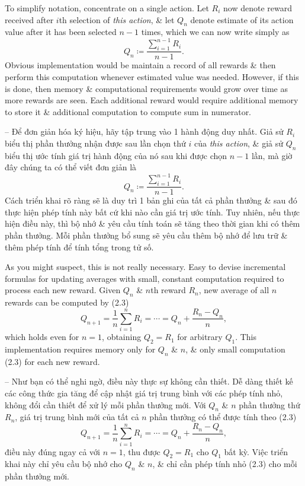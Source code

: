 \documentclass{article}
\begin{document}
\begin{itemize}
\begin{itemize}
        To simplify notation, concentrate on a single action. Let $R_i$ now denote reward received after $i$th selection of {\it this action}, \& let $Q_n$ denote estimate of its action value after it has been selected $n - 1$ times, which we can now write simply as
        \begin{equation*}
            Q_n\coloneqq\frac{\sum_{i=1}^{n-1} R_i}{n - 1}.
        \end{equation*}
        Obvious implementation would be maintain a record of all rewards \& then perform this computation whenever estimated value was needed. However, if this is done, then memory \& computational requirements would grow over time as more rewards are seen. Each additional reward would require additional memory to store it \& additional computation to compute sum in numerator.

        -- Để đơn giản hóa ký hiệu, hãy tập trung vào 1 hành động duy nhất. Giả sử $R_i$ biểu thị phần thưởng nhận được sau lần chọn thứ $i$ của {\it this action}, \& giả sử $Q_n$ biểu thị ước tính giá trị hành động của nó sau khi được chọn $n - 1$ lần, mà giờ đây chúng ta có thể viết đơn giản là
        \begin{equation*}
            Q_n\coloneqq\frac{\sum_{i=1}^{n-1} R_i}{n - 1}.
        \end{equation*}
        Cách triển khai rõ ràng sẽ là duy trì 1 bản ghi của tất cả phần thưởng \& sau đó thực hiện phép tính này bất cứ khi nào cần giá trị ước tính. Tuy nhiên, nếu thực hiện điều này, thì bộ nhớ \& yêu cầu tính toán sẽ tăng theo thời gian khi có thêm phần thưởng. Mỗi phần thưởng bổ sung sẽ yêu cầu thêm bộ nhớ để lưu trữ \& thêm phép tính để tính tổng trong tử số.

        As you might suspect, this is not really necessary. Easy to devise incremental formulas for updating averages with small, constant computation required to process each new reward. Given $Q_n$ \& $n$th reward $R_n$, new average of all $n$ rewards can be computed by (2.3)
        \begin{equation*}
            Q_{n+1} = \frac{1}{n}\sum_{i=1}^n R_i = \cdots = Q_n + \frac{R_n - Q_n}{n},
        \end{equation*}
        which holds even for $n = 1$, obtaining $Q_2 = R_1$ for arbitrary $Q_1$. This implementation requires memory only for $Q_n$ \& $n$, \& only small computation (2.3) for each new reward.

        -- Như bạn có thể nghi ngờ, điều này thực sự không cần thiết. Dễ dàng thiết kế các công thức gia tăng để cập nhật giá trị trung bình với các phép tính nhỏ, không đổi cần thiết để xử lý mỗi phần thưởng mới. Với $Q_n$ \& $n$ phần thưởng thứ $R_n$, giá trị trung bình mới của tất cả $n$ phần thưởng có thể được tính theo (2.3)
        \begin{equation*}
            Q_{n+1} = \frac{1}{n}\sum_{i=1}^n R_i = \cdots = Q_n + \frac{R_n - Q_n}{n},
        \end{equation*}
        điều này đúng ngay cả với $n = 1$, thu được $Q_2 = R_1$ cho $Q_1$ bất kỳ. Việc triển khai này chỉ yêu cầu bộ nhớ cho $Q_n$ \& $n$, \& chỉ cần phép tính nhỏ (2.3) cho mỗi phần thưởng mới.


\end{itemize}
\end{itemize}
\end{document}
